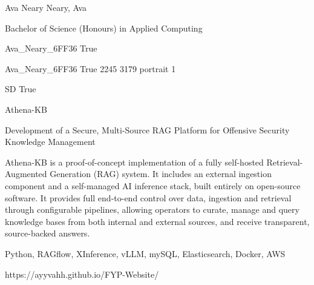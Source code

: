 
\begingroup{}\relax



\def\Key{Ava_Neary_6FF36}

{Ava Neary}
{Neary, Ava}

{Bachelor of Science (Honours) in Applied Computing}

{Ava_Neary_6FF36}
{True}

{Ava_Neary_6FF36}
{True}
{2245}
{3179}
{portrait}
{1}

{SD}
{True}

{Athena-KB}

{Development of a Secure, Multi-Source RAG Platform for Offensive Security Knowledge Management}

{Athena-KB is a proof-of-concept implementation of a fully self-hosted Retrieval-Augmented Generation (RAG) system. It includes an external ingestion component and a self-managed AI inference stack, built entirely on open-source software. It provides full end-to-end control over data, ingestion and retrieval through configurable pipelines, allowing operators to curate, manage and query knowledge bases from both internal and external sources, and receive transparent, source-backed answers.}

{Python, RAGflow, XInference, vLLM, mySQL, Elasticsearch, Docker, AWS}

{https://ayyvahh.github.io/FYP-Website/}

